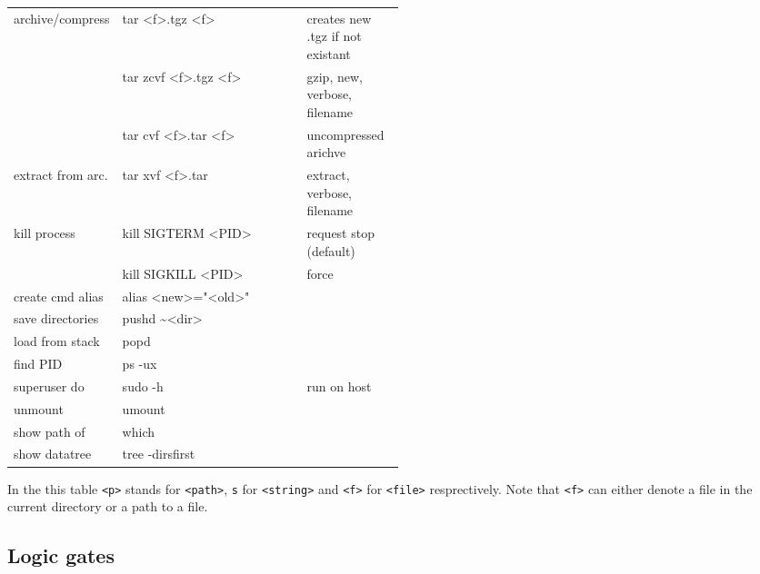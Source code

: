 {    \begin{tabularx}{\linewidth}{@{} p{0.25\linewidth}>{\ttfamily}lp{0.25\linewidth} @{}}
        archive/compress  & tar <f>.tgz <f>            & creates new .tgz if not existant \\
                          & tar zcvf <f>.tgz <f>       & gzip, new, verbose, filename     \\
                          & tar cvf <f>.tar <f>        & uncompressed arichve             \\
        extract from arc. & tar xvf <f>.tar            & extract, verbose, filename       \\
        kill process      & kill SIGTERM <PID>         & request stop (default)           \\
                          & kill SIGKILL <PID>         & force                            \\
        create cmd alias  & alias <new>="<old>"        &                                  \\
        save directories  & pushd \textasciitilde<dir> &                                  \\
        load from stack   & popd                       &                                  \\
        find PID          & ps -ux                     &                                  \\
        superuser do      & sudo -h                    & run on host                      \\
        unmount           & umount                     &                                  \\
        show path of      & which                      &                                  \\
        show datatree     & tree -dirsfirst            &                                  \\
        \bottomrule
    \end{tabularx}

} %

\renewcommand{\arraystretch}{1}
\setlength{\tabcolsep}{\oldtabcolsep}

In the this table \texttt{<p>} stands for \texttt{<path>}, \texttt{s} for \texttt{<string>} and \texttt{<f>} for \texttt{<file>} resprectively. Note that \texttt{<f>} can either denote a file in the current directory or a path to a file.

\subsection{Logic gates}

